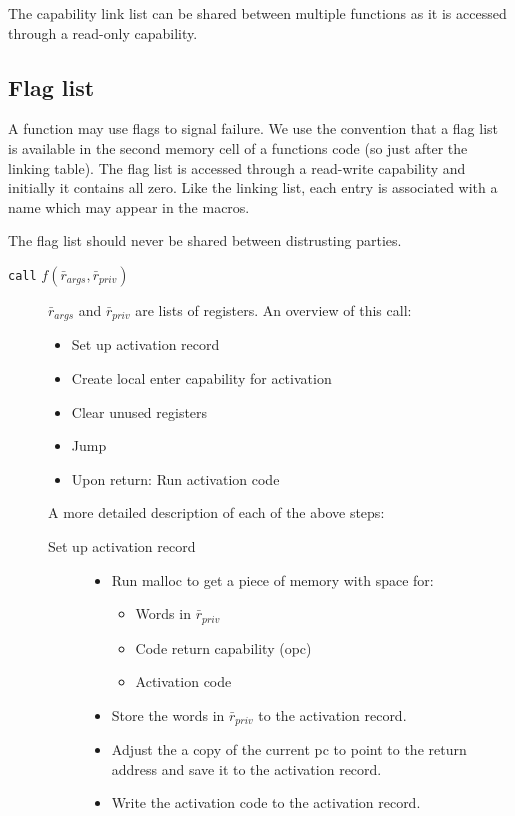 \documentclass[a4paper]{article}
\newcommand{\var}[1]{\mathit{#1}}
\begin{document}
The capability link list can be shared between multiple functions as it is accessed through a read-only capability.

\subsection{Flag list}
A function may use flags to signal failure. We use the convention that a flag list is available in the second memory cell of a functions code (so just after the linking table). The flag list is accessed through a read-write capability and initially it contains all zero. Like the linking list, each entry is associated with a name which may appear in the macros.

The flag list should never be shared between distrusting parties.

\begin{description}
\item[\texttt{call} $f(\bar{r}_{\var{args}},\bar{r}_{\var{priv}})$] $\bar{r}_{\var{args}}$ and $\bar{r}_{\var{priv}}$ are lists of registers. An overview of this call:
  \begin{itemize}
  \item Set up activation record
  \item Create local enter capability for activation
  \item Clear unused registers
  \item Jump
  \item Upon return: Run activation code
  \end{itemize}
A more detailed description of each of the above steps:
\begin{description}
  \item [Set up activation record]
    \begin{itemize}
    \item Run malloc to get a piece of memory with space for:
    \begin{itemize}
      \item Words in $\bar{r}_{\var{priv}}$
      \item Code return capability (opc)
      \item Activation code
    \end{itemize}
    \item Store the words in $\bar{r}_{\var{priv}}$ to the activation record. 
    \item Adjust the a copy of the current pc to point to the return address and save it to the activation record.
    \item Write the activation code to the activation record.

\end{itemize}
\end{description}
\end{description}
\end{document}
